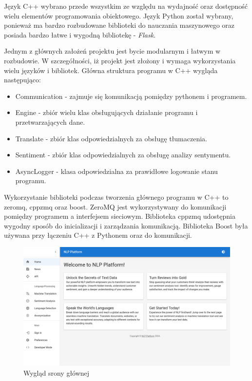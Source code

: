 \documentclass{article}
\begin{document}
\noindent Język C++ wybrano przede wszystkim ze względu na wydajność oraz dostępność wielu elementów programowania obiektowego. Język Python został wybrany, ponieważ ma bardzo rozbudowane biblioteki do nauczania maszynowego oraz posiada bardzo łatwe i wygodną bibliotekę - \textit{Flask}.

Jednym z głównych założeń projektu jest bycie modularnym i łatwym w rozbudowie. W szczegółności, iż projekt jest złożony i wymaga wykorzystania wielu języków i bibliotek. Główna struktura programu w C++ wygląda następująco:

\begin{itemize}
  \item Communication - zajmuje się komunikacją pomiędzy pythonem i programem.
  \item Engine - zbiór wielu klas obsługujących działanie programu i przetwarzających dane.
  \item Translate - zbiór klas odpowiedzialnych za obsługę tłumaczenia.
  \item Sentiment - zbiór klas odpowiedzialnych za obsługę analizy sentymentu.
  \item AsyncLogger - klasa odpowiedzialna za prawidłowe logowanie stanu programu.
\end{itemize}

Wykorzystanie biblioteki podczas tworzenia głównego programu w C++ to zeromq, cppzmq oraz boost. ZeroMQ jest wykorzystywany do komunikacji pomiędzy programem a interfejsem sieciowym. Biblioteka cppzmq udostępnia wygodny sposób do inicializacji i zarządzania komunikacją. Biblioteka Boost była używana przy łączeniu C++ z Pythonem oraz do komunikacji.

\begin{figure}[h!]
\centering
  \includegraphics[width=1\linewidth]{img/nlp-dashboard.png}
  \caption{\label{fig:nlp dashboard}Wygląd srony głównej}
\end{figure}
\end{document}
